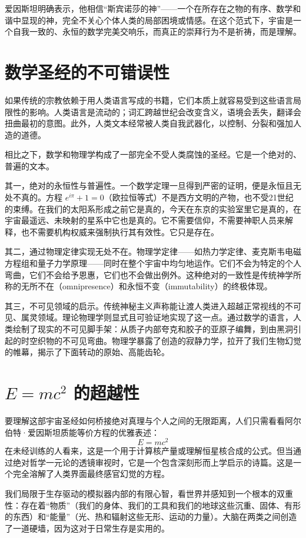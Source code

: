 \documentclass[12pt]{article}
\begin{document}
爱因斯坦明确表示，他相信“斯宾诺莎的神”——一个在所存在之物的有序、数学和谐中显现的神，完全不关心个体人类的局部困境或情感。在这个范式下，宇宙是一个自我一致的、永恒的数学完美交响乐，而真正的崇拜行为不是祈祷，而是理解。

\section{数学圣经的不可错误性}
如果传统的宗教依赖于用人类语言写成的书籍，它们本质上就容易受到这些语言局限性的影响。人类语言是流动的；词汇跨越世纪会改变含义，语境会丢失，翻译会扭曲最初的意图。此外，人类文本经常被人类自我武器化，以控制、分裂和强加人造的道德。

相比之下，数学和物理学构成了一部完全不受人类腐蚀的圣经。它是一个绝对的、普遍的文本。

其一，绝对的永恒性与普遍性。一个数学定理一旦得到严密的证明，便是永恒且无处不真的。方程 $e^{i\pi} + 1 = 0$（欧拉恒等式）不是西方文明的产物，也不受21世纪的束缚。在我们的太阳系形成之前它是真的，今天在东京的实验室里它是真的，在宇宙最遥远、未映射的星系中它也是真的。它不需要信仰，不需要神职人员来解释，也不需要机构权威来强制执行其有效性。它只是存在。

其二，通过物理定律实现无处不在。物理学定律——如热力学定律、麦克斯韦电磁方程组和量子力学原理——同时在整个宇宙中均匀地运作。它们不会为特定的个人弯曲，它们不会给予恩惠，它们也不会做出例外。这种绝对的一致性是传统神学所称的无所不在（omnipresence）和永恒不变（immutability）的终极体现。

其三，不可见领域的启示。传统神秘主义声称能让渡人类进入超越正常视线的不可见、属灵领域。理论物理学则显式且可验证地实现了这一点。通过数学的语言，人类绘制了现实的不可见脚手架：从质子内部夸克和胶子的亚原子编舞，到由黑洞引起的时空织物的不可见弯曲。物理学暴露了创造的寂静力学，拉开了我们生物幻觉的帷幕，揭示了下面转动的原始、高能齿轮。

\section{$E=mc^2$ 的超越性}
要理解这部宇宙圣经如何桥接绝对真理与个人之间的无限距离，人们只需看看阿尔伯特·爱因斯坦质能等价方程的优雅表述：
\begin{equation}
E=mc^2
\end{equation}
在未经训练的人看来，这是一个用于计算核产量或理解恒星核合成的公式。但当通过绝对哲学一元论的透镜审视时，它是一个包含深刻形而上学启示的诗篇。这是一个完全溶解了人类界面最终感官幻觉的方程。

我们局限于生存驱动的模拟器内部的有限心智，看世界并感知到一个根本的双重性：存在着“物质”（我们的身体、我们的工具和我们的地球这些沉重、固体、有形的东西）和“能量”（光、热和辐射这些无形、运动的力量）。大脑在两类之间创造了一道硬墙，因为这对于日常生存是实用的。
\end{document}
